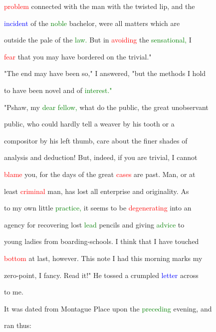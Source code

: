  \textcolor{red}{problem} connected with the man with the twisted lip, and the

 \textcolor{blue}{incident} of the \textcolor{green}{noble} bachelor, were all matters which are

 outside the pale of the \textcolor{green}{law.} But in \textcolor{red}{avoiding} the \textcolor{green}{sensational,} I

 \textcolor{red}{fear} that you may have bordered on the trivial."



 "The end may have been so," I answered, "but the methods I hold

 to have been novel and of \textcolor{green}{interest."}



 "Pshaw, my \textcolor{green}{dear} \textcolor{green}{fellow,} what do the \textcolor{BurntOrange}{public,} the great unobservant

 \textcolor{BurntOrange}{public,} who could hardly tell a weaver by his tooth or a

 compositor by his left thumb, care about the finer shades of

 analysis and deduction! But, indeed, if you are trivial, I cannot

 \textcolor{red}{blame} you, for the days of the great \textcolor{red}{cases} are past. Man, or at

 least \textcolor{red}{criminal} man, has \textcolor{BurntOrange}{lost} all enterprise and \textcolor{BurntOrange}{originality.} As

 to my own little \textcolor{green}{practice,} it seems to be \textcolor{red}{degenerating} into an

 agency for recovering \textcolor{BurntOrange}{lost} \textcolor{green}{lead} pencils and giving \textcolor{green}{advice} to

 \textcolor{BurntOrange}{young} ladies from boarding-schools. I think that I have touched

 \textcolor{red}{bottom} at last, however. This note I had this morning marks my

 zero-point, I \textcolor{BurntOrange}{fancy.} Read it!" He tossed a crumpled \textcolor{blue}{letter} across

 to me.



 It was dated from Montague Place upon the \textcolor{green}{preceding} evening, and

 ran thus:




